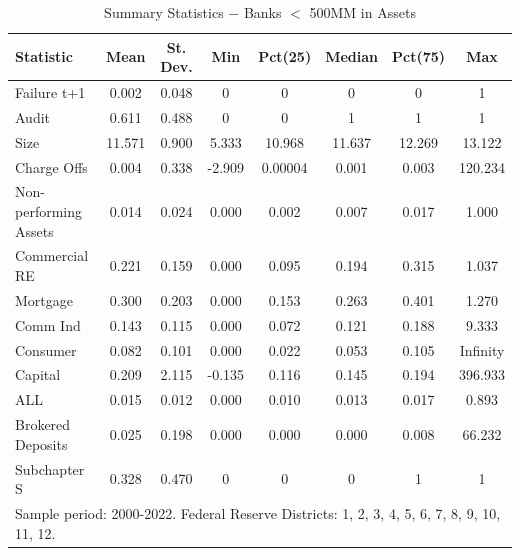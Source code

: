 \documentclass[12pt]{article}
\begin{document}
\clearpage
\begin{table}[H]
\centering
\caption{Summary Statistics $-$ Banks $<$ 500MM in Assets}
\label{tab:stats_small}
\begin{tabular}{lccccccc}
\toprule
Statistic & Mean & St. Dev. & Min & Pct(25) & Median & Pct(75) & Max \\
\midrule
Failure t+1 & 0.002 & 0.048 & 0 & 0 & 0 & 0 & 1 \\
Audit & 0.611 & 0.488 & 0 & 0 & 1 & 1 & 1 \\
Size & 11.571 & 0.900 & 5.333 & 10.968 & 11.637 & 12.269 & 13.122 \\
Charge Offs & 0.004 & 0.338 & -2.909 & 0.00004 & 0.001 & 0.003 & 120.234 \\
Non-performing Assets & 0.014 & 0.024 & 0.000 & 0.002 & 0.007 & 0.017 & 1.000 \\
Commercial RE & 0.221 & 0.159 & 0.000 & 0.095 & 0.194 & 0.315 & 1.037 \\
Mortgage & 0.300 & 0.203 & 0.000 & 0.153 & 0.263 & 0.401 & 1.270 \\
Comm Ind & 0.143 & 0.115 & 0.000 & 0.072 & 0.121 & 0.188 & 9.333 \\
Consumer & 0.082 & 0.101 & 0.000 & 0.022 & 0.053 & 0.105 & Infinity \\
Capital & 0.209 & 2.115 & -0.135 & 0.116 & 0.145 & 0.194 & 396.933 \\
ALL & 0.015 & 0.012 & 0.000 & 0.010 & 0.013 & 0.017 & 0.893 \\
Brokered Deposits & 0.025 & 0.198 & 0.000 & 0.000 & 0.000 & 0.008 & 66.232 \\
Subchapter S & 0.328 & 0.470 & 0 & 0 & 0 & 1 & 1 \\
\bottomrule
\multicolumn{8}{l}{Sample period: 2000-2022. Federal Reserve Districts: 1, 2, 3, 4, 5, 6, 7, 8, 9, 10, 11, 12.}
\end{tabular}
\end{table}
\end{document}
